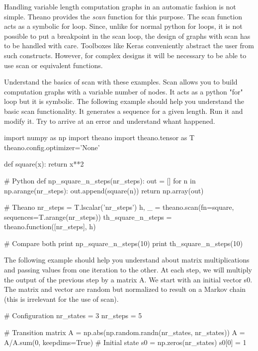 Handling variable length computation graphs in an automatic fashion is not simple. 
Theano provides the \textit{scan} function for this purpose. The scan function acts
as a symbolic for loop. Since, unlike for normal python for loops, it is not
possible to put a breakpoint in the scan loop, the design of graphs
with scan has to be handled with care. Toolboxes like Keras conveniently abstract
the user from such constructs. However, for complex designs it will be
necessary to be able to use scan or equivalent functions. 

\begin{exercise}
Understand the basics of scan with these examples. Scan allows you to build
computation graphs with a variable number of nodes. It acts as a python "for"
loop but it is symbolic. The following example should help you understand the
basic scan functionality. It generates a sequence for a given length. Run it
and modify it. Try to arrive at an error and understand whant happened.
\begin{python}
import numpy as np
import theano
import theano.tensor as T
theano.config.optimizer='None'

def square(x): 
    return x**2 

# Python
def np_square_n_steps(nr_steps):
    out = []
    for n in np.arange(nr_steps):
        out.append(square(n))
    return np.array(out)


\end{python}
\begin{python}
# Theano
nr_steps = T.lscalar('nr_steps')
h, _ = theano.scan(fn=square, sequences=T.arange(nr_steps))
th_square_n_steps = theano.function([nr_steps], h)

# Compare both
print np_square_n_steps(10)
print th_square_n_steps(10)
\end{python}
The following example should help you understand about matrix multiplications
and passing values from one iteration to the other. At each step, we will
multiply the output of the previous step by a matrix A. We start with an
initial vector s0. The matrix and vector are random but normalized to result on
a Markov chain (this is irrelevant for the use of scan).  
\begin{python}
# Configuration
nr_states = 3
nr_steps = 5

# Transition matrix
A = np.abs(np.random.randn(nr_states, nr_states))
A = A/A.sum(0, keepdims=True)
# Initial state
s0 = np.zeros(nr_states)
s0[0] = 1
\end{python}



\end{exercise}
